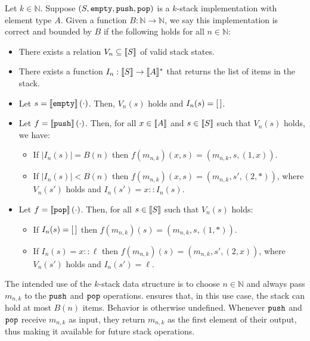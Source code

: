 \begin{definition}
\label{def:stack-correctness}
Let $k \in \mathbb N$. Suppose $(S, \mathtt{empty}, \mathtt{push}, \mathtt{pop})$ is a $k$-stack implementation with element type $A$. Given a function $B : \mathbb N \to \mathbb N$, we say this implementation is correct and bounded by $B$ if the following holds for all $n \in \mathbb N$:
\begin{itemize}
  \item There exists a relation $V_n \subseteq \llbracket S \rrbracket$ of valid stack states.
  \item There exists a function $I_n : \llbracket S \rrbracket \to \llbracket A \rrbracket^*$ that returns the list of items in the stack.
  \item Let $s = {\llbracket \mathtt{empty} \rrbracket}\left(\cdot\right)$. Then, $V_n(s)$ holds and $I_n(s) = [ \, ]$.
  \item Let $f = {\llbracket \mathtt{push} \rrbracket}\left(\cdot\right)$. Then, for all $x \in \llbracket A \rrbracket$ and $s \in \llbracket S \rrbracket$ such that $V_n(s)$ holds, we have:
  \begin{itemize}
    \item If $|I_n(s)| = B(n)$ then $f(m_{n,k})(x, s) = (m_{n,k}, s, (1, x))$.
    \item If $|I_n(s)| < B(n)$ then $f(m_{n,k})(x, s) = (m_{n,k}, s', (2, \ast))$, where $V_n(s')$ holds and $I_n(s') = x :: I_n(s)$.
  \end{itemize}
  \item Let $f = {\llbracket \mathtt{pop} \rrbracket}\left(\cdot\right)$. Then, for all $s \in \llbracket S \rrbracket$ such that $V_n(s)$ holds:
  \begin{itemize}
    \item If $I_n(s) = [ \, ]$ then $f(m_{n,k})(s) = (m_{n,k}, s, (1, \ast))$.
    \item If $I_n(s) = x :: \ell$ then $f(m_{n,k})(s) = (m_{n,k}, s', (2, x))$, where $V_n(s')$ holds and $I_n(s') = \ell$.
  \end{itemize}
\end{itemize}
\end{definition}

The intended use of the $k$-stack data structure is to choose $n \in \mathbb N$ and always pass $m_{n,k}$ to the $\mathtt{push}$ and $\mathtt{pop}$ operations.
 ensures that, in this use case, the stack can hold at most $B(n)$ items. Behavior is otherwise undefined. Whenever $\mathtt{push}$ and $\mathtt{pop}$ receive $m_{n,k}$ as input, they return $m_{n,k}$ as the first element of their output, thus making it available for future stack operations.


